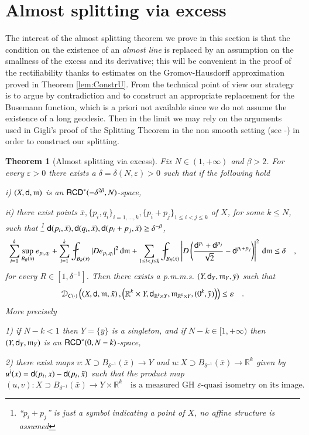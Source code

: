 \documentclass[11pt,reqno]{amsart}
\newcommand{\mm}{\mathfrak m}
\newcommand{\sfd}{{\sf d}}
\renewcommand{\d}{{\rm{d}}}
\newcommand{\R}{\mathbb{R}}
\newcommand{\RCD}{{\sf RCD}}
\newcommand{\DC}{\mathcal D_{C(\cdot)}}
\newcommand{\vare}{\varepsilon}
\newtheorem{theorem}{Theorem}[section]
\theoremstyle{definition}
\theoremstyle{remark}
\theoremstyle{remark}
\theoremstyle{remark}
\theoremstyle{remark}
\theoremstyle{remark}
\theoremstyle{remark}
\theoremstyle{remark}
\begin{document}
\section{Almost  splitting via excess}\label{Sec:AlmSplit}
The interest of the almost splitting theorem we prove in this section is that the condition on the existence of an {\it almost line} is replaced by an assumption on the smallness of the excess and its derivative;  this will be convenient in the proof of  the rectifiability thanks to estimates on the Gromov-Hausdorff approximation  proved in Theorem \ref{lem:ConstrU}.   From the technical point of view our strategy is to argue by contradiction and to construct an appropriate replacement for the Busemann function, which is a priori not available since we do not assume the  existence of a long geodesic.  Then in the limit we may rely on the arguments used in Gigli's proof of the Splitting Theorem in the non smooth setting (see \cite{GigliSplitting}-\cite{GigliSplittingSur}) in order to construct our splitting.

\begin{theorem}[Almost splitting via excess]\label{thm:AlmSplit}
Fix $N\in (1, +\infty)$ and $\beta>2$. For every $\vare>0$ there exists a $\delta=\delta(N,\vare)>0$  such that if the following hold

i) $(X,\sfd,\mm)$ is an $\RCD^*(-\delta^{2\beta},N)$-space,

ii) there exist points  $\bar{x}, \{p_i,q_i\}_{i=1,\ldots, k}, \{p_i+p_j\}_{1\leq i< j \leq k}$ of $X$, for some $k\leq N$,  such that \footnote{``$p_i+p_j$'' is just a symbol indicating a point of $X$, no affine structure is assumed} $\sfd(p_i,\bar{x}), \sfd(q_i,\bar{x}),  \sfd(p_i+p_j,\bar{x})\geq \delta^{-\beta}$,
\begin{equation} \nonumber
\sum_{i=1}^{k} \sup_{B_R(\bar{x})} e_{p_{i},q_{i}} + \sum_{i=1}^k \fint _{B_R(\bar{x})} |D e_{p_i,q_i}|^2 \, \d \mm + \sum_{1\leq i< j\leq k} \fint_{B_R(\bar{x})}  \left|D \left( \frac{\sfd^{p_i}+\sfd^{p_j}} {\sqrt 2} - \sfd^{p_i+p_j}\right) \right|^2 \, \d \mm   \leq \delta  \quad,  
\end{equation} 
for every $R\in [1,\delta^{-1}]$.
 Then there exists a p.m.m.s. $(Y,\sfd_Y, \mm_Y, \bar{y})$ such that
 $$\DC \left( \left(X, \sfd, \mm, \bar{x} \right), \left( \R^k\times Y,\sfd_{\R^k\times Y},\mm_{\R^k\times Y}, (0^k, \bar{y})  \right) \right) \leq  \vare \quad . 
 $$
 More precisely
 
 1) if $N-k<1$ then $Y=\{\bar{y}\}$ is a singleton,  and if $N-k\in [1,+\infty)$ then  $(Y,\sfd_Y, \mm_Y)$ is an $\RCD^*(0,N-k)$-space,
 
 2) there exist maps $v:X\supset B_{\delta^{-1}}(\bar{x})\to Y$ and $u:X\supset B_{\delta^{-1}}(\bar{x}) \to \R^k$ given by $u^i(x)=\sfd(p_i,x)-\sfd(p_i,\bar{x})$ such that the product map
 $$(u,v):X \supset B_{\delta^{-1}}(\bar{x})\to Y\times \R^k \quad \text{is a measured GH $\vare$-quasi isometry on its image}. $$ 
\end{theorem}
\end{document}
